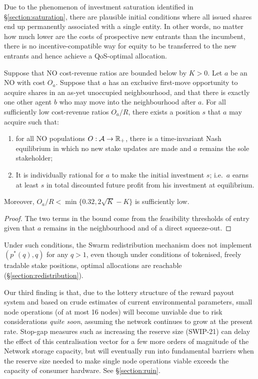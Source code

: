 Due to the phenomenon of investment saturation identified in \S\ref{section:saturation}, there are plausible initial conditions where all issued shares end up permanently associated with a single entity.
%
In other words, no matter how much lower are the costs of prospective new entrants than the incumbent, there is no incentive-compatible way for equity to be transferred to the new entrants and hence achieve a QoS-optimal allocation.

\begin{proposition}
  \label{thm:block-entry}

  Suppose that NO cost-revenue ratios are bounded below by $K>0$.
  Let $a$ be an NO with cost $O_a$. 
  Suppose that $a$ has an exclusive first-move opportunity to acquire shares in an as-yet unoccupied neighbourhood, and that there is exactly one other agent $b$ who may move into the neighbourhood after $a$.
  For all sufficiently low cost-revenue ratios $O_a/R$, there exists a position $s$ that $a$ may acquire such that:
  \begin{enumerate}
    \item for all NO populations $O:\mathcal{A}\rightarrow\mathbb{R}_+$, there is a time-invariant Nash equilibrium in which no new stake updates are made and $a$ remains the sole stakeholder;
    \item It is individually rational for $a$ to make the initial investment $s$; i.e.~$a$ earns at least $s$ in total discounted future profit from his investment at equilibrium.
  \end{enumerate}
  Moreover, $O_a/R < \min\{0.32, 2\sqrt{K}-K\}$ is sufficiently low.

\end{proposition}
%
\begin{proof}

  The two terms in the bound come from the feasibility thresholds of entry given that $a$ remains in the neighbourhood and of a direct squeeze-out. \qedhere

\end{proof}

Under such conditions, the Swarm redistribution mechanism does not implement $(p^*(q),q)$ for any $q>1$, even though under conditions of tokenised, freely tradable stake positions, optimal allocations are reachable (\S\ref{section:redistribution}).


Our third finding is that, due to the lottery structure of the reward payout system and based on crude estimates of current environmental parameters, small node operations (of at most 16 nodes) will become unviable due to risk considerations \emph{quite soon}, assuming the network continues to grow at the present rate.
%
Stop-gap measures such as increasing the reserve size (SWIP-21) can delay the effect of this centralisation vector for a few more orders of magnitude of the Network storage capacity, but will eventually run into fundamental barriers when the reserve size needed to make single node operations viable exceeds the capacity of consumer hardware.
%
See \S\ref{section:ruin}.



